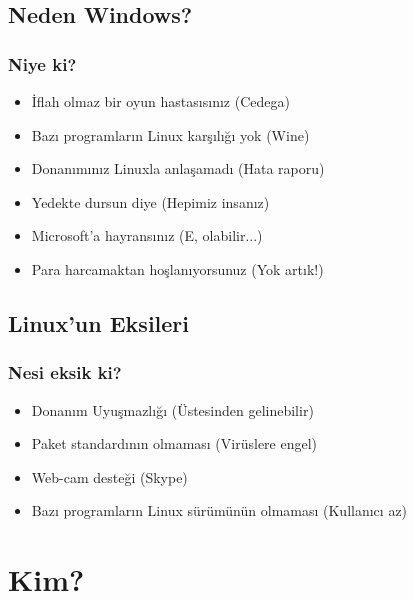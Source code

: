 \documentclass{beamer}
\begin{document}
	\subsection{Neden Windows?}
		\begin{frame}
		 	\frametitle{Niye ki?}
			\begin{itemize}[<+->]
			 \item İflah olmaz bir oyun hastasısınız (Cedega)
			 \item Bazı programların Linux karşılığı yok (Wine)
			 \item Donanımınız Linuxla anlaşamadı (Hata raporu)
			 \item Yedekte dursun diye (Hepimiz insanız)
			 \item Microsoft'a hayransınız (E, olabilir...)
			 \item Para harcamaktan hoşlanıyorsunuz (Yok artık!)
			\end{itemize}

		\end{frame}
	
	\subsection {Linux'un Eksileri}
		\begin{frame}
			\frametitle{Nesi eksik ki?}
			\begin{itemize}[<+->]
			 \item Donanım Uyuşmazlığı (Üstesinden gelinebilir)
			 \item Paket standardının olmaması (Virüslere engel)
			 \item Web-cam desteği (Skype)
			 \item Bazı programların Linux sürümünün olmaması (Kullanıcı az)
			\end{itemize}

		\end{frame}



\section{Kim?}
\end{document}
